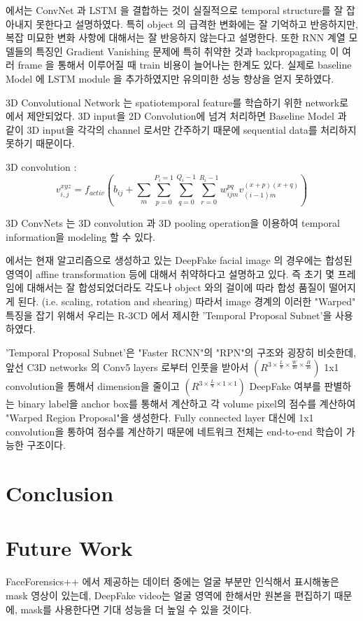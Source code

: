 \documentclass{article}
\begin{document}
	\cite{quovadis2017Recog} 에서는 ConvNet 과 LSTM 을 결합하는 것이 실질적으로 temporal structure를 잘 잡아내지 못한다고 설명하였다. 특히 object 의 급격한 변화에는 잘 기억하고 반응하지만, 복잡 미묘한 변화 사항에 대해서는 잘 반응하지 않는다고 설명한다. 또한 RNN 계열 모델들의 특징인 Gradient Vanishing 문제에 특히 취약한 것과 backpropagating 이 여러 frame 을 통해서 이루어질 때 train 비용이 늘어나는 한계도 있다. 실제로 baseline Model \cite{quovadis2017Recog}에 LSTM module 을 추가하였지만 유의미한 성능 향상을 얻지 못하였다.

	3D Convolutional Network 는 spatiotemporal feature를 학습하기 위한 network로 \cite{TranBFTP14} 에서 제안되었다. 3D input을 2D Convolution에 넘겨 처리하면 Baseline Model 과 같이 3D input을 각각의 channel 로서만 간주하기 때문에 sequential data를 처리하지 못하기 때문이다.

	3D convolution : \[ v^{xyz}_{i,j} = f_{activ}(b_{ij} + \sum_{m}\sum_{p=0}^{P_{i}=1}\sum_{q=0}^{Q_{i}-1}\sum_{r=0}^{R_{i}-1}w_{ijm}^{pq}v_{(i-1)m}^{(x+p)(x+q)}) \]

	3D ConvNets 는 3D convolution 과 3D pooling operation을 이용하여 temporal information을 modeling 할 수 있다.

	\cite{abs-1811-00656} 에서는 현재 알고리즘으로 생성하고 있는 DeepFake facial image 의 경우에는 합성된 영역이 affine transformation 등에 대해서 취약하다고 설명하고 있다. 즉 초기 몇 프레임에 대해서는 잘 합성되었더라도 각도나 object 와의 걸이에 따라 합성 품질이 떨어지게 된다. (i.e. scaling, rotation and shearing) 따라서 image 경계의 이러한 "Warped" 특징을 잡기 위해서 우리는 R-3CD \cite{XuDS17} 에서 제시한 'Temporal Proposal Subnet'을 사용하였다. 

	'Temporal Proposal Subnet'은 "Faster RCNN"의 "RPN"의 구조와 굉장히 비슷한데, 앞선 C3D networks 의 Conv5 layers 로부터 인풋을 받아서 $(R^{3\times\frac{L}{8}\times\frac{W}{16}\times\frac{H}{16}})$ 1x1 convolution을 통해서 dimension을 줄이고 $(R^{3\times\frac{L}{8}\times1\times1})$ DeepFake 여부를 판별하는 binary label을 anchor box를 통해서 계산하고 각 volume pixel의 점수를 계산하여 "Warped Region Proposal"을 생성한다. Fully connected layer 대신에 1x1 convolution을 통하여 점수를 계산하기 때문에 네트워크 전체는 end-to-end 학습이 가능한 구조이다.
	
	\section{Conclusion}
	
	\section{Future Work}
	FaceForensics++ 에서 제공하는 데이터 중에는 얼굴 부분만 인식해서 표시해놓은 mask 영상이 있는데, DeepFake video는 얼굴 영역에 한해서만 원본을 편집하기 때문에, mask를 사용한다면 기대 성능을 더 높일 수 있을 것이다. 
	
\end{document}
